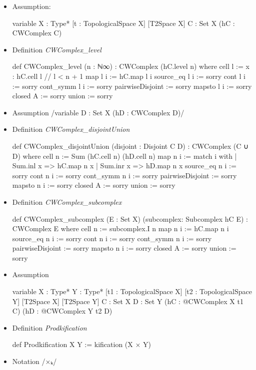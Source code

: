 \documentclass[colorinlistoftodos]{article}
\begin{document}
\begin{itemize}
  \item Assumption:
\begin{leancode}
variable {X : Type*} [t : TopologicalSpace X] [T2Space X] {C : Set X} (hC : CWComplex C)
\end{leancode}
  \item Definition \emph{CWComplex\_level}
\begin{leancode}
def CWComplex_level (n : ℕ∞) : CWComplex (hC.level n) where
  cell l := {x : hC.cell l // l < n + 1}
  map l i := hC.map l i
  source_eq l i := sorry
  cont l i := sorry
  cont_symm l i := sorry
  pairwiseDisjoint := sorry
  mapsto l i := sorry
  closed A := sorry
  union := sorry
\end{leancode}
  \item Assumption \lean /variable {D : Set X} (hD : CWComplex D)/
  \item Definition \emph{CWComplex\_disjointUnion}
\begin{leancode}
def CWComplex_disjointUnion (disjoint : Disjoint C D) : CWComplex (C ∪ D) where
  cell n := Sum (hC.cell n) (hD.cell n)
  map n i :=
    match i with
    | Sum.inl x => hC.map n x
    | Sum.inr x => hD.map n x
  source_eq n i := sorry
  cont n i := sorry
  cont_symm n i := sorry
  pairwiseDisjoint := sorry
  mapsto n i := sorry
  closed A := sorry
  union := sorry
\end{leancode}
  \item Definition \emph{CWComplex\_subcomplex}
\begin{leancode}
def CWComplex_subcomplex (E : Set X) (subcomplex: Subcomplex hC E) : CWComplex E where
  cell n := subcomplex.I n
  map n i := hC.map n i
  source_eq n i := sorry
  cont n i := sorry
  cont_symm n i := sorry
  pairwiseDisjoint := sorry
  mapsto n i := sorry
  closed A := sorry
  union := sorry
\end{leancode}
  \item Assumption
\begin{leancode}
variable {X : Type*} {Y : Type*} [t1 : TopologicalSpace X] [t2 : TopologicalSpace Y]
[T2Space X] [T2Space Y] {C : Set X} {D : Set Y} (hC : @CWComplex X t1 C)
(hD : @CWComplex Y t2 D)
\end{leancode}
  \item Definition \emph{Prodkification}
\begin{leancode}
def Prodkification X Y := kification (X × Y)
\end{leancode}
  \item Notation \lean /×ₖ/

\end{itemize}
\end{document}
